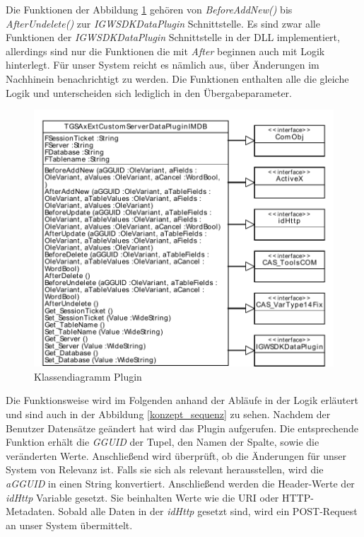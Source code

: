 Die Funktionen der Abbildung \ref{ergebniss_plugin_klassendiagramm} gehören von \textit{BeforeAddNew()} bis \textit{AfterUndelete()} zur \textit{IGWSDKDataPlugin} Schnittstelle. Es sind zwar alle Funktionen der \textit{IGWSDKDataPlugin} Schnittstelle in der DLL implementiert, allerdings sind nur die Funktionen die mit \textit{After} beginnen auch mit Logik hinterlegt. Für unser System reicht es nämlich aus, über Änderungen im Nachhinein benachrichtigt zu werden. Die Funktionen enthalten alle die gleiche Logik und unterscheiden sich lediglich in den Übergabeparameter.

\begin{figure}[htbp]
\centering
\includegraphics[scale=0.7]{pics/plugin_klassendiagramm.pdf}
\caption{Klassendiagramm Plugin}
\label{ergebniss_plugin_klassendiagramm}
\end{figure}

Die Funktionsweise wird im Folgenden anhand der Abläufe in der Logik erläutert und sind auch in der Abbildung \ref{konzept_sequenz} zu sehen. Nachdem der Benutzer Datensätze geändert hat wird das Plugin aufgerufen. Die entsprechende Funktion erhält die \textit{GGUID} der Tupel, den Namen der Spalte, sowie die veränderten Werte. Anschließend wird überprüft, ob die Änderungen für unser System von Relevanz ist. Falls sie sich als relevant herausstellen, wird die \textit{aGGUID} in einen String konvertiert. Anschließend werden die Header-Werte der \textit{idHttp} Variable gesetzt. Sie beinhalten Werte wie die URI oder HTTP-Metadaten. Sobald alle Daten in der \textit{idHttp} gesetzt sind, wird ein POST-Request an unser System übermittelt. 

